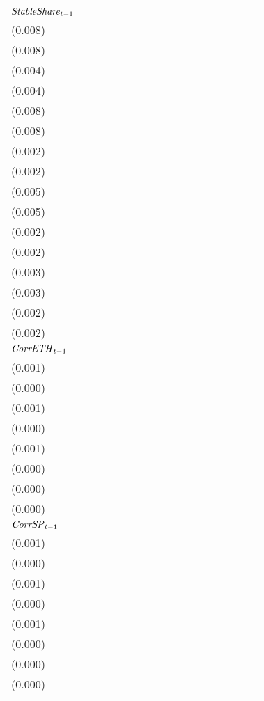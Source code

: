 \begin{tabular}{lllllllllllllllll}
${{\it StableShare}}_{t-1}$  &   \makecell{$0.628^{**}$ \\(0.008)} &   \makecell{$0.627^{**}$ \\(0.008)} &   \makecell{$0.107^{**}$ \\(0.004)} &   \makecell{$0.107^{**}$ \\(0.004)} &  \makecell{$-0.202^{**}$ \\(0.008)} &  \makecell{$-0.201^{**}$ \\(0.008)} &  \makecell{$-0.006^{**}$ \\(0.002)} &  \makecell{$-0.006^{**}$ \\(0.002)} &  \makecell{$-0.189^{**}$ \\(0.005)} &  \makecell{$-0.188^{**}$ \\(0.005)} &  \makecell{$-0.007^{**}$ \\(0.002)} &  \makecell{$-0.007^{**}$ \\(0.002)} &   \makecell{$0.258^{**}$ \\(0.003)} &  \makecell{$0.258^{**}$ \\(0.003)} &  \makecell{$0.027^{**}$ \\(0.002)} &  \makecell{$0.027^{**}$ \\(0.002)} \\
${{\it CorrETH}}_{t-1}$      &  \makecell{$-0.019^{**}$ \\(0.001)} &                                     &  \makecell{$-0.002^{**}$ \\(0.000)} &                                     &   \makecell{$0.003^{**}$ \\(0.001)} &                                     &     \makecell{$0.000^{}$ \\(0.000)} &                                     &    \makecell{$0.001^{*}$ \\(0.001)} &                                     &     \makecell{$0.000^{}$ \\(0.000)} &                                     &  \makecell{$-0.004^{**}$ \\(0.000)} &                                    &   \makecell{$-0.000^{}$ \\(0.000)} &                                    \\
${{\it CorrSP}}_{t-1}$       &                                     &  \makecell{$-0.014^{**}$ \\(0.001)} &                                     &  \makecell{$-0.002^{**}$ \\(0.000)} &                                     &  \makecell{$-0.005^{**}$ \\(0.001)} &                                     &    \makecell{$-0.000^{}$ \\(0.000)} &                                     &  \makecell{$-0.003^{**}$ \\(0.001)} &                                     &    \makecell{$-0.000^{}$ \\(0.000)} &                                     &   \makecell{$-0.000^{}$ \\(0.000)} &                                    &    \makecell{$0.000^{}$ \\(0.000)} \\

\end{tabular}
